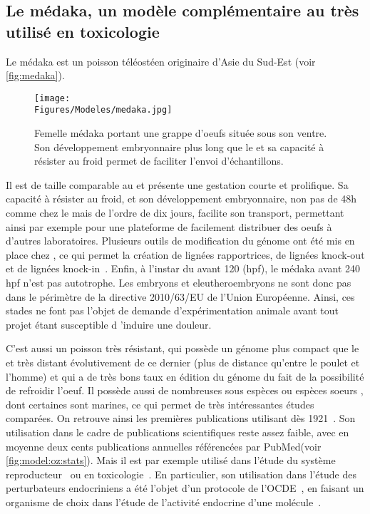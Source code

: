 \documentclass[\main/main.tex]{subfiles}
\begin{document}
    \subsection{\label{sec:medaka}Le médaka, un modèle complémentaire au \pz{} très utilisé en toxicologie}
    
%
Le médaka est un poisson téléostéen originaire d'Asie du Sud-Est (voir \autoref{fig:medaka}).

\begin{figure}[h!]
    \centering
    \texttt{[image: \\Figures/Modeles/medaka.jpg]}
    \caption{
    Femelle médaka portant une grappe d'oeufs située sous son ventre.
    \newline
    Son développement embryonnaire plus long que le \pz{} et sa capacité à résister au froid permet de faciliter l'envoi d'échantillons.
    }
    \label{fig:medaka}
\end{figure}

%
Il est de taille comparable au \pz{} et présente une gestation courte et prolifique.
%
Sa capacité à résister au froid, et son développement embryonnaire, non pas de 48h comme chez le \pz{} mais de l'ordre de dix jours,  facilite son transport, permettant ainsi par exemple pour une plateforme de facilement distribuer des oeufs à d'autres laboratoires.
%
Plusieurs outils de modification du génome ont été mis en place chez \ol{}\cite{kirchmaier_2015, ansai_2017},
ce qui permet la création de lignées rapportrices, de lignées knock-out et de lignées knock-in~\cite{abdelmoneim_2018,jin_2020,Watakabe_2018,qiu_2014,gay_2018}.
%
Enfin, à l'instar du \pz{} avant 120 \hpf{} (hpf),
le médaka avant 240 hpf n'est pas autotrophe.
%
Les embryons et eleutheroembryons ne sont donc pas dans le périmètre de la directive 2010/63/EU de l'Union Européenne.
%
Ainsi, ces stades ne font pas l'objet de demande d'expérimentation animale avant tout projet étant susceptible d 'induire une douleur.

%
C'est aussi un poisson très résistant, qui possède un génome plus compact que le \pz{} et très distant évolutivement de ce dernier (plus de distance qu'entre le poulet et l'homme) et qui a de très bons taux en édition du génome du fait de la possibilité de refroidir l'oeuf.
%
Il possède aussi de nombreuses sous espèces ou espèces soeurs , dont certaines sont marines, ce qui permet de très intéressantes études comparées.
%
On retrouve ainsi les premières publications utilisant \ol{} dès 1921~\cite{aida_1921}.
%
Son utilisation dans le cadre de publications scientifiques reste assez faible, avec en moyenne deux cents publications annuelles référencées par PubMed(voir \autoref{fig:model:oz:stats}).
%
Mais il est par exemple utilisé dans l'étude du système reproducteur~\cite{gay_2018,herberg_2018} ou
en toxicologie~\cite{carvan_2007,bertotto_2019,cleary_2019,powe_2018}.
%
En particulier, son utilisation dans l'étude des perturbateurs endocriniens a été l'objet d'un protocole de l'OCDE~\cite{oecd_2009}, en faisant un organisme de choix dans l'étude de l'activité endocrine d'une molécule~\cite{chen_2018,dang_2019,spirhanzlova_2016}.
\end{document}
